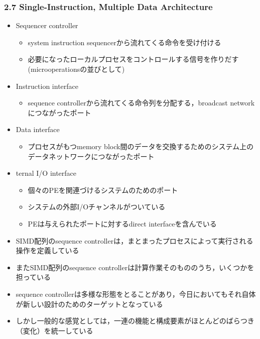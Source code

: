 \documentclass[12pt, unicode, dvipdfmx]{beamer}
\begin{document}
\begin{frame}[t]
	\frametitle{2.7 Single-Instruction, Multiple Data Architecture}
	\begin{itemize}
		\item Sequencer controller
		\begin{itemize}
			\item system instruction sequencerから流れてくる命令を受け付ける
			\item 必要になったローカルプロセスをコントロールする信号を作りだす(microoperationsの並びとして)
		\end{itemize}
	\item Instruction interface
		\begin{itemize}
			\item sequence controllerから流れてくる命令列を分配する，broadcast networkにつながったポート
		\end{itemize}
	\item Data interface
		\begin{itemize}
			\item プロセスがもつmemory block間のデータを交換するためのシステム上のデータネットワークにつながったポート
		\end{itemize}
		\item ternal I/O interface
		\begin{itemize}
			\item 個々のPEを関連づけるシステムのためのポート
			\item システムの外部I/Oチャンネルがついている
			\item PEは与えられたポートに対するdirect interfaceを含んでいる
		\end{itemize}
	\end{itemize}
\end{frame}

\begin{frame}[t]
	\begin{itemize}
		\item SIMD配列のsequence controllerは，まとまったプロセスによって実行される操作を定義している
		\item またSIMD配列のsequence controllerは計算作業そのもののうち，いくつかを担っている
		\item sequence controllerは多様な形態をとることがあり，今日においてもそれ自体が新しい設計のためのターゲットとなっている
		\item しかし一般的な感覚としては，一連の機能と構成要素がほとんどのばらつき（変化）を統一している
	\end{itemize}
\end{frame}
\end{document}

